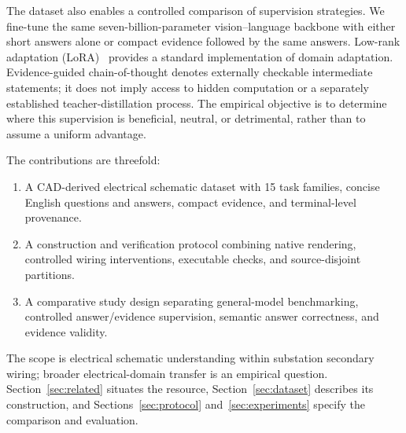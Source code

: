 The dataset also enables a controlled comparison of supervision strategies. We fine-tune the same seven-billion-parameter vision--language backbone with either short answers alone or compact evidence followed by the same answers. Low-rank adaptation (LoRA)~\cite{hu2021lora} provides a standard implementation of domain adaptation. Evidence-guided chain-of-thought denotes externally checkable intermediate statements; it does not imply access to hidden computation or a separately established teacher-distillation process. The empirical objective is to determine where this supervision is beneficial, neutral, or detrimental, rather than to assume a uniform advantage.

The contributions are threefold:
\begin{enumerate}
\item A CAD-derived electrical schematic dataset with 15 task families, concise English questions and answers, compact evidence, and terminal-level provenance.
\item A construction and verification protocol combining native rendering, controlled wiring interventions, executable checks, and source-disjoint partitions.
\item A comparative study design separating general-model benchmarking, controlled answer/evidence supervision, semantic answer correctness, and evidence validity.
\end{enumerate}
The scope is electrical schematic understanding within substation secondary wiring; broader electrical-domain transfer is an empirical question. Section~\ref{sec:related} situates the resource, Section~\ref{sec:dataset} describes its construction, and Sections~\ref{sec:protocol} and~\ref{sec:experiments} specify the comparison and evaluation.
